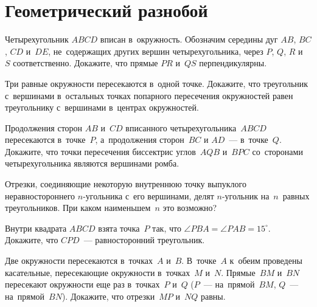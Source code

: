 

\section*{Геометрический разнобой}


\begin{problems}

\item
Четырехугольник $ABCD$ вписан в~окружность.
Обозначим середины дуг $AB$, $BC$, $CD$ и~$DE$, не~содержащих других вершин
четырехугольника, через $P$, $Q$, $R$ и~$S$ соответственно.
Докажите, что прямые $PR$ и~$QS$ перпендикулярны.

\item
Три равные окружности пересекаются в~одной точке.
Докажите, что треугольник с~вершинами в~остальных точках попарного пересечения
окружностей равен треугольнику с~вершинами в~центрах окружностей.

\item
Продолжения сторон $AB$ и~$CD$ вписанного четырехугольника~$ABCD$ пересекаются
в~точке~$P$, а~продолжения сторон~$BC$ и $AD$~--- в~точке~$Q$.
Докажите, что точки пересечения биссектрис углов~$AQB$ и~$BPC$ со~сторонами
четырехугольника являются вершинами ромба.

\item
Отрезки, соединяющие некоторую внутреннюю точку выпуклого неравностороннего
$n$-угольника с~его вершинами, делят $n$-угольник на~$n$~равных треугольников.
При каком наименьшем~$n$ это возможно?

\item
Внутри квадрата $ABCD$ взята точка~$P$ так, что
$\angle PBA = \angle PAB = 15^\circ$.
Докажите, что $CPD$~--- равносторонний треугольник.

\item
Две окружности пересекаются в~точках~$A$ и~$B$.
В~точке~$A$ к~обеим проведены касательные, пересекающие окружности
в~точках~$M$ и~$N$.
Прямые~$BM$ и~$BN$ пересекают окружности еще раз в~точках~$P$ и~$Q$
($P$~--- на~прямой~$BM$, $Q$~--- на~прямой~$BN$).
Докажите, что отрезки~$MP$ и~$NQ$ равны.

\end{problems}

